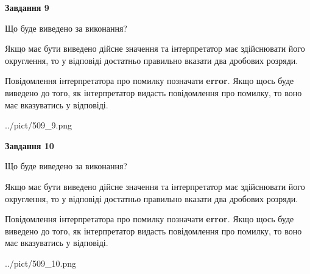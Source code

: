 \documentclass[12pt, ukrainian]{article}
\begin{document}
{\begin {Large}
{\begin {center}\textbf{Завдання 9}\end {center}}\par
Що буде виведено за виконання? \par

Якщо має бути виведено дійсне значення та інтерпретатор має здійснювати його округлення, 
то у відповіді достатньо правильно вказати два дробових розряди.

Повідомлення інтерпретатора про помилку позначати \textbf{error}.
Якщо щось буде виведено до того, як інтерпретатор видасть повідомлення про помилку, 
то воно має вказуватись у відповіді. \par

\begin{center}
	{../pict/509_9.png}
\end{center}
\newpage

{\begin {center}\textbf{Завдання 10}\end {center}}\par
Що буде виведено за виконання? \par

Якщо має бути виведено дійсне значення та інтерпретатор має здійснювати його округлення, 
то у відповіді достатньо правильно вказати два дробових розряди.

Повідомлення інтерпретатора про помилку позначати \textbf{error}.
Якщо щось буде виведено до того, як інтерпретатор видасть повідомлення про помилку, 
то воно має вказуватись у відповіді. \par

\begin{center}
	{../pict/509_10.png}
\end{center}
\newpage

\end {Large}}
\end{document}
